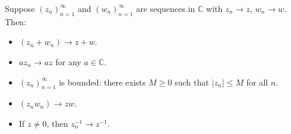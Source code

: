 Suppose $(z_n)_{n=1}^{\infty}$ and $(w_n)_{n=1}^{\infty}$ are sequences in $\mathbb{C}$ with $z_n \to z$, $w_n \to w$. Then:
\begin{itemize}
\item[(a)] $(z_n + w_n) \to z + w$.
\item[(b)] $a z_n \to a z$ for any $a \in \mathbb{C}$.
\item[(c)] $(z_n)_{n=1}^{\infty}$ is bounded: there exists $M \geq 0$ such that $|z_n| \leq M$ for all $n$.
\item[(d)] $(z_n w_n) \to z w$.
\item[(e)] If $z \neq 0$, then $z_n^{-1} \to z^{-1}$.
\end{itemize}
